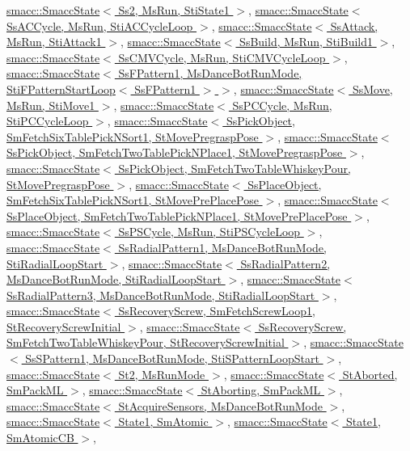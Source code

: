 \hyperlink{classsmacc_1_1SmaccState}{smacc\+::\+Smacc\+State$<$ Ss2, Ms\+Run, Sti\+State1 $>$}, \hyperlink{classsmacc_1_1SmaccState}{smacc\+::\+Smacc\+State$<$ Ss\+A\+C\+Cycle, Ms\+Run, Sti\+A\+C\+Cycle\+Loop $>$}, \hyperlink{classsmacc_1_1SmaccState}{smacc\+::\+Smacc\+State$<$ Ss\+Attack, Ms\+Run, Sti\+Attack1 $>$}, \hyperlink{classsmacc_1_1SmaccState}{smacc\+::\+Smacc\+State$<$ Ss\+Build, Ms\+Run, Sti\+Build1 $>$}, \hyperlink{classsmacc_1_1SmaccState}{smacc\+::\+Smacc\+State$<$ Ss\+C\+M\+V\+Cycle, Ms\+Run, Sti\+C\+M\+V\+Cycle\+Loop $>$}, \hyperlink{classsmacc_1_1SmaccState}{smacc\+::\+Smacc\+State$<$ Ss\+F\+Pattern1, Ms\+Dance\+Bot\+Run\+Mode, Sti\+F\+Pattern\+Start\+Loop$<$ Ss\+F\+Pattern1 $>$ $>$}, \hyperlink{classsmacc_1_1SmaccState}{smacc\+::\+Smacc\+State$<$ Ss\+Move, Ms\+Run, Sti\+Move1 $>$}, \hyperlink{classsmacc_1_1SmaccState}{smacc\+::\+Smacc\+State$<$ Ss\+P\+C\+Cycle, Ms\+Run, Sti\+P\+C\+Cycle\+Loop $>$}, \hyperlink{classsmacc_1_1SmaccState}{smacc\+::\+Smacc\+State$<$ Ss\+Pick\+Object, Sm\+Fetch\+Six\+Table\+Pick\+N\+Sort1, St\+Move\+Pregrasp\+Pose $>$}, \hyperlink{classsmacc_1_1SmaccState}{smacc\+::\+Smacc\+State$<$ Ss\+Pick\+Object, Sm\+Fetch\+Two\+Table\+Pick\+N\+Place1, St\+Move\+Pregrasp\+Pose $>$}, \hyperlink{classsmacc_1_1SmaccState}{smacc\+::\+Smacc\+State$<$ Ss\+Pick\+Object, Sm\+Fetch\+Two\+Table\+Whiskey\+Pour, St\+Move\+Pregrasp\+Pose $>$}, \hyperlink{classsmacc_1_1SmaccState}{smacc\+::\+Smacc\+State$<$ Ss\+Place\+Object, Sm\+Fetch\+Six\+Table\+Pick\+N\+Sort1, St\+Move\+Pre\+Place\+Pose $>$}, \hyperlink{classsmacc_1_1SmaccState}{smacc\+::\+Smacc\+State$<$ Ss\+Place\+Object, Sm\+Fetch\+Two\+Table\+Pick\+N\+Place1, St\+Move\+Pre\+Place\+Pose $>$}, \hyperlink{classsmacc_1_1SmaccState}{smacc\+::\+Smacc\+State$<$ Ss\+P\+S\+Cycle, Ms\+Run, Sti\+P\+S\+Cycle\+Loop $>$}, \hyperlink{classsmacc_1_1SmaccState}{smacc\+::\+Smacc\+State$<$ Ss\+Radial\+Pattern1, Ms\+Dance\+Bot\+Run\+Mode, Sti\+Radial\+Loop\+Start $>$}, \hyperlink{classsmacc_1_1SmaccState}{smacc\+::\+Smacc\+State$<$ Ss\+Radial\+Pattern2, Ms\+Dance\+Bot\+Run\+Mode, Sti\+Radial\+Loop\+Start $>$}, \hyperlink{classsmacc_1_1SmaccState}{smacc\+::\+Smacc\+State$<$ Ss\+Radial\+Pattern3, Ms\+Dance\+Bot\+Run\+Mode, Sti\+Radial\+Loop\+Start $>$}, \hyperlink{classsmacc_1_1SmaccState}{smacc\+::\+Smacc\+State$<$ Ss\+Recovery\+Screw, Sm\+Fetch\+Screw\+Loop1, St\+Recovery\+Screw\+Initial $>$}, \hyperlink{classsmacc_1_1SmaccState}{smacc\+::\+Smacc\+State$<$ Ss\+Recovery\+Screw, Sm\+Fetch\+Two\+Table\+Whiskey\+Pour, St\+Recovery\+Screw\+Initial $>$}, \hyperlink{classsmacc_1_1SmaccState}{smacc\+::\+Smacc\+State$<$ Ss\+S\+Pattern1, Ms\+Dance\+Bot\+Run\+Mode, Sti\+S\+Pattern\+Loop\+Start $>$}, \hyperlink{classsmacc_1_1SmaccState}{smacc\+::\+Smacc\+State$<$ St2, Ms\+Run\+Mode $>$}, \hyperlink{classsmacc_1_1SmaccState}{smacc\+::\+Smacc\+State$<$ St\+Aborted, Sm\+Pack\+M\+L $>$}, \hyperlink{classsmacc_1_1SmaccState}{smacc\+::\+Smacc\+State$<$ St\+Aborting, Sm\+Pack\+M\+L $>$}, \hyperlink{classsmacc_1_1SmaccState}{smacc\+::\+Smacc\+State$<$ St\+Acquire\+Sensors, Ms\+Dance\+Bot\+Run\+Mode $>$}, \hyperlink{classsmacc_1_1SmaccState}{smacc\+::\+Smacc\+State$<$ State1, Sm\+Atomic $>$}, \hyperlink{classsmacc_1_1SmaccState}{smacc\+::\+Smacc\+State$<$ State1, Sm\+Atomic\+C\+B $>$}, 